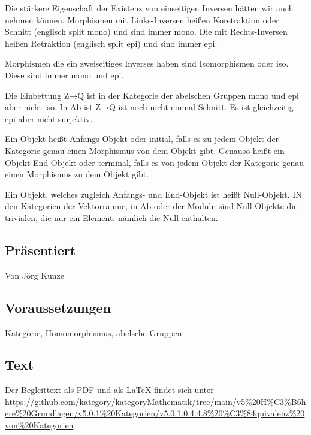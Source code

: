 \documentclass[a4paper]{amsart}
\theoremstyle{definition}
\begin{document}
Die stärkere Eigenschaft der Existenz von einseitigen Inversen hätten wir auch nehmen können. Morphismen mit Links-Inversen heißen Koretraktion oder Schnitt (englisch split mono) und sind immer mono. Die mit Rechts-Inversen heißen Retraktion (englisch split epi) und sind immer epi. 

Morphismen die ein zweiseitiges Inverses haben sind Isomorphismen oder iso. Diese sind immer mono und epi.

Die Einbettung Z→Q ist in der Kategorie der abelschen Gruppen mono und epi aber nicht iso.
In Ab ist Z→Q ist noch nicht einmal Schnitt. Es ist gleichzeitig epi aber nicht surjektiv.

Ein Objekt heißt Anfangs-Objekt oder initial, falls es zu jedem Objekt der Kategorie genau einen Morphismus von dem Objekt gibt. Genauso heißt ein Objekt End-Objekt oder terminal, falls es von jedem Objekt der Kategorie genau einen Morphismus zu dem Objekt gibt.

Ein Objekt, welches zugleich Anfangs- und End-Objekt ist heißt Null-Objekt. IN den Kategorien der Vektorräume, in Ab oder der Moduln sind Null-Objekte die trivialen, die nur ein Element, nämlich die Null enthalten.

\subsection*{Präsentiert}
Von Jörg Kunze

\subsection*{Voraussetzungen}
Kategorie, Homomorphismus, abelsche Gruppen

\subsection*{Text}
Der Begleittext als PDF und als LaTeX findet sich unter
{\tiny
   \url{https://github.com/kategory/kategoryMathematik/tree/main/v5%20H%C3%B6here%20Grundlagen/v5.0.1%20Kategorien/v5.0.1.0.4.4.8%20%C3%84quivalenz%20von%20Kategorien}
}
\end{document}
